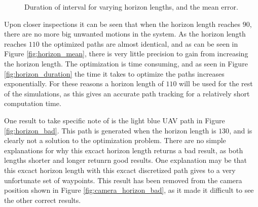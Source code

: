 \begin{figure}
	\caption{Duration of interval for varying horizon lengths, and the mean error.}
\end{figure}

Upon closer inspections it can be seen that when the horizon length reaches $90$, there are no more big unwanted motions in the system. As the horizon length reaches $110$ the optimized paths are almost identical, and as can be seen in Figure \ref{fig:horizon_mean}, there is very little precision to gain from increasing the horizon length. The optimization is time consuming, and as seen in Figure \ref{fig:horizon_duration} the time it takes to optimize the paths increases exponentially. For these reasons a horizon length of $110$ will be used for the rest of the simulations, as this gives an accurate path tracking for a relatively short computation time.

One result to take specific note of is the light blue UAV path in Figure \ref{fig:horizon_bad}. This path is generated when the horizon length is $130$, and is clearly not a solution to the optimization problem. There are no simple explanations for why this excact horizon length returns a bad result, as both lengths shorter and longer retunrn good results. One explanation may be that this excact horizon length with this excact discretized path gives to a very unfortunate set of waypoints. This result has been removed from the camera position shown in Figure \ref{fig:camera_horizon_bad}, as it made it difficult to see the other correct results.